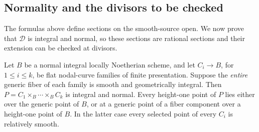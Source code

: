 \subsection{Normality and the divisors to be checked}

The formulas above define sections on the smooth-source open. We now
prove that $\mathcal D$ is integral and normal, so these sections are
rational sections and their extension can be checked at divisors.

\begin{lemma}
\label{ext:normal-products}
Let $B$ be a normal integral locally Noetherian scheme, and let
$C_i\to B$, for $1\leq i\leq k$, be flat nodal-curve families of
finite presentation. Suppose the \emph{entire} generic fiber of each
family is smooth and geometrically integral. Then
$P=C_1\times_B\cdots\times_B C_k$ is integral and normal.
Every height-one point of $P$ lies either over the generic point of
$B$, or at a generic point of a fiber component over a height-one
point of $B$. In the latter case every selected point of every
$C_i$ is relatively smooth.
\end{lemma}

